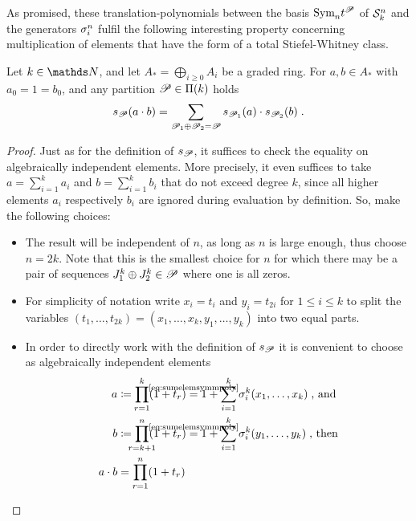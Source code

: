 As promised, these translation-polynomials between the basis
$\text{\normalfont Sym}_{n}t^{\mathscr{P}}$ of $\mathcal{S}^{n}_k$ and the generators $\sigma_{i}^{n}$
fulfil the following interesting property concerning
multiplication of elements that have the form of a total
Stiefel-Whitney class.
\begin{Lem}\label{lem:productrule:general}
  Let $k\in\Nat$, and let $A_*=\bigoplus_{i\geq 0} A_i$ be a graded ring.
  For $a,b\in A_*$ with $a_0=1=b_0$, and any partition
  $\mathscr{P}\in\Pi({k})$ holds
  \begin{gather*}
    s_{\mathscr{P}}(a\cdot b)
    = \sum_{\mathscr{P}_1\oplus\mathscr{P}_2=\mathscr{P}}
    s_{\mathscr{P}_1}(a) \cdot s_{\mathscr{P}_2}(b)
    \;.
  \end{gather*}
  \begin{proof}
    Just as for the definition of $s_{\mathscr{P}}$, it suffices to check
    the equality on algebraically independent elements. More
    precisely, it even suffices to take $a=\sum_{i=1}^k a_i$ and
    $b=\sum_{i=1}^k b_i$ that do not exceed degree $k$, since all higher
    elements $a_i$ respectively $b_i$ are ignored during evaluation by
    definition.
    So, make the following choices:
    \begin{itemize}
    \item The result will be independent of $n$, as long as
      $n$ is large enough, thus choose $n=2k$.
      Note that this is the smallest choice for $n$ for which there
      may be a pair of sequences $J_1^k\oplus J_2^k\in\mathscr{P}$
      where one is all zeros.
    \item For simplicity of notation write
      $x_i=t_i$ and $y_i=t_{2i}$ for $1\leq i\leq k$ to split the
      variables $(t_1,\dotsc,t_{2k})=(x_1,\dotsc,x_k,y_1,\dotsc,y_k)$
      into two equal parts.
    \item In order to directly work with the definition of $s_{\mathscr{P}}$ it is
      convenient to choose as algebraically independent elements
      \begin{align*}
        a &\coloneqq
            \prod_{\mathclap{r=1}}^k(1+t_r)
            \cequalsby{\eqref{eq:sumelemsymmpoly}}
            1 + \sum_{i=1}^k \el i k(x_1,\dotsc,x_k)
            \;\text{, and}\\
        b &\coloneqq
            \prod_{\mathclap{r=k+1}}^n(1+t_r)
            \cequalsby{\eqref{eq:sumelemsymmpoly}}
            1 + \sum_{i=1}^k \el i k(y_1,\dotsc,y_k)
            \;\text{, then}\\
        a\cdot b
          &=
            \prod_{r=1}^n (1+t_r)

\end{align*}
\end{itemize}
\end{proof}
\end{Lem}
